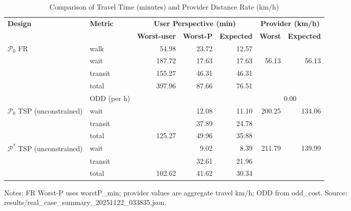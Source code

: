 \begin{table}[t]
\centering
\caption{Comparison of Travel Time (minutes) and Provider Distance Rate (km/h)}
\begin{tabular}{l l r r r r r}
\toprule
\textbf{Design} & \textbf{Metric} & 
\multicolumn{3}{c}{\textbf{User Perspective (min)}} & 
\multicolumn{2}{c}{\textbf{Provider (km/h)}} \\
\cmidrule(lr){3-5}\cmidrule(lr){6-7}
& & \textbf{Worst-user} & \textbf{Worst-P} & \textbf{Expected} & \textbf{Worst} & \textbf{Expected} \\
\midrule
$\mathcal{P}_0$ FR & walk    & 54.98 & 23.72 & 12.57 &        &        \\
                   & wait    & 187.72 & 17.63 & 17.63 & 56.13  & 56.13  \\
                   & transit & 155.27 & 46.31 & 46.31 &        &        \\
                   & total   & 397.96 & 87.66 & 76.51 &       &        \\
                   & ODD (per h) &  &  &  & \multicolumn{2}{c}{0.00} \\
\midrule
$\mathcal{P}_0$ TSP (unconstrained) & wait    &  & 12.08 & 11.10 & 200.25 & 134.06 \\
                                    & transit &  & 37.89 & 24.78 &        &       \\
                                    & total   & 125.27 & 49.96 & 35.88 &        &       \\
\midrule
$\mathcal{P}^*$ TSP (unconstrained) & wait    &  & 9.02 & 8.39 & 211.79 & 139.99 \\
                                    & transit &  & 32.61 & 21.96 &        &       \\
                                    & total   & 102.62 & 41.62 & 30.34 &        &       \\
\bottomrule
\end{tabular}

\vspace{0.5ex}
\small
Notes: FR Worst-P uses worstP\_min; provider values are aggregate travel km/h; ODD from odd\_cost. Source: results/real_case_summary_20251122_033835.json.
\end{table}